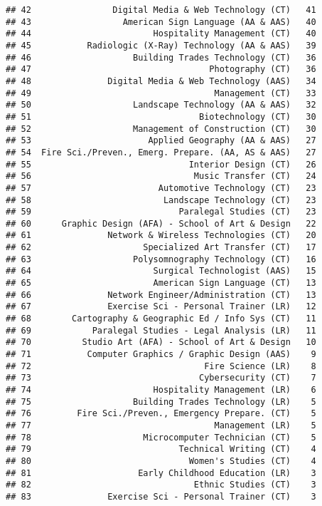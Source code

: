 \documentclass[]{article}
\begin{document}
\begin{verbatim}
## 42                Digital Media & Web Technology (CT)   41
## 43                  American Sign Language (AA & AAS)   40
## 44                        Hospitality Management (CT)   40
## 45           Radiologic (X-Ray) Technology (AA & AAS)   39
## 46                    Building Trades Technology (CT)   36
## 47                                   Photography (CT)   36
## 48               Digital Media & Web Technology (AAS)   34
## 49                                    Management (CT)   33
## 50                    Landscape Technology (AA & AAS)   32
## 51                                 Biotechnology (CT)   30
## 52                    Management of Construction (CT)   30
## 53                       Applied Geography (AA & AAS)   27
## 54  Fire Sci./Preven., Emerg. Prepare. (AA, AS & AAS)   27
## 55                               Interior Design (CT)   26
## 56                                Music Transfer (CT)   24
## 57                         Automotive Technology (CT)   23
## 58                          Landscape Technology (CT)   23
## 59                             Paralegal Studies (CT)   23
## 60      Graphic Design (AFA) - School of Art & Design   22
## 61               Network & Wireless Technologies (CT)   20
## 62                      Specialized Art Transfer (CT)   17
## 63                    Polysomnography Technology (CT)   16
## 64                        Surgical Technologist (AAS)   15
## 65                        American Sign Language (CT)   13
## 66               Network Engineer/Administration (CT)   13
## 67               Exercise Sci - Personal Trainer (LR)   12
## 68        Cartography & Geographic Ed / Info Sys (CT)   11
## 69            Paralegal Studies - Legal Analysis (LR)   11
## 70          Studio Art (AFA) - School of Art & Design   10
## 71           Computer Graphics / Graphic Design (AAS)    9
## 72                                  Fire Science (LR)    8
## 73                                 Cybersecurity (CT)    7
## 74                        Hospitality Management (LR)    6
## 75                    Building Trades Technology (LR)    5
## 76         Fire Sci./Preven., Emergency Prepare. (CT)    5
## 77                                    Management (LR)    5
## 78                      Microcomputer Technician (CT)    5
## 79                             Technical Writing (CT)    4
## 80                               Women's Studies (CT)    4
## 81                     Early Childhood Education (LR)    3
## 82                                Ethnic Studies (CT)    3
## 83               Exercise Sci - Personal Trainer (CT)    3

\end{verbatim}
\end{document}
